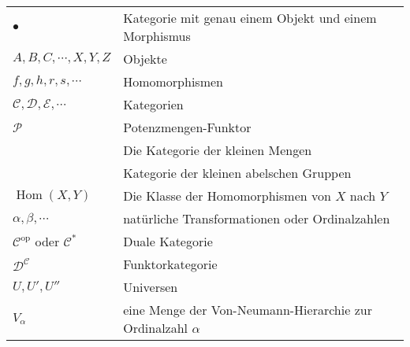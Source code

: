 \documentclass[a4paper]{amsart}
\theoremstyle{definition}
\DeclareMathOperator{\Hom}{Hom}
\newcommand{\CC}{\ensuremath{\mathcal{ C }}}
\newcommand{\DD}{\ensuremath{\mathcal{ D }}}
\newcommand{\PP}{\ensuremath{\mathcal{ P }}}
\newcommand{\Set}{\text{\textbf{Set}}}
\newcommand{\Ab}{\text{\textbf{Ab}}}
\begin{document}
\renewcommand*{\arraystretch}{1}

\begin{tabular}{ll}
    $\bullet$                           & Kategorie mit genau einem Objekt und einem Morphismus\\
    $A, B, C, \cdots, X, Y, Z$          & Objekte\\
    $f, g, h, r, s, \cdots$             & Homomorphismen\\
    $\mathcal C, \mathcal D, \mathcal E, \cdots$ & Kategorien\\
    $\PP$                               & Potenzmengen-Funktor\\
    \Set                                & Die Kategorie der kleinen Mengen\\
    \Ab                                 & Kategorie der kleinen abelschen Gruppen\\
    $\Hom( X, Y)$                       & Die Klasse der Homomorphismen von $X$ nach $Y$\\
    $\alpha, \beta, \cdots$             & natürliche Transformationen oder Ordinalzahlen\\
    $\mathcal C ^{\text{op}}$ oder $\mathcal C ^{*}$         & Duale Kategorie\\
    $\DD^\CC$                           & Funktorkategorie\\
    $U, U', U''$                        & Universen\\
    $V_\alpha$                          & eine Menge der Von-Neumann-Hierarchie zur Ordinalzahl
                                          $\alpha$

\end{tabular}
\end{document}
